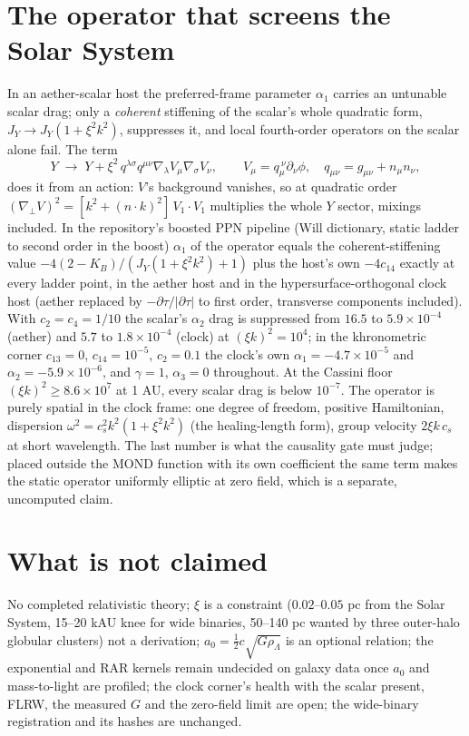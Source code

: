 \documentclass[11pt,letterpaper]{article}
\begin{document}
\section{The operator that screens the Solar System}
In an aether-scalar host the preferred-frame parameter $\alpha_1$ carries an untunable scalar drag; only a \emph{coherent} stiffening of the scalar's whole quadratic form, $J_Y\to J_Y(1+\xi^2k^2)$, suppresses it, and local fourth-order operators on the scalar alone fail. The term
\begin{equation}
Y\;\to\;Y+\xi^2\,q^{\lambda\sigma}q^{\mu\nu}\nabla_\lambda V_\mu\nabla_\sigma V_\nu,\qquad V_\mu=q_\mu^{\ \nu}\partial_\nu\phi,\quad q_{\mu\nu}=g_{\mu\nu}+n_\mu n_\nu,
\end{equation}
does it from an action: $V$'s background vanishes, so at quadratic order $(\nabla_\perp V)^2=[k^2+(n\!\cdot\!k)^2]\,V_1\!\cdot\!V_1$ multiplies the whole $Y$ sector, mixings included. In the repository's boosted PPN pipeline (Will dictionary, static ladder to second order in the boost) $\alpha_1$ of the operator equals the coherent-stiffening value $-4(2-K_B)/(J_Y(1+\xi^2k^2)+1)$ plus the host's own $-4c_{14}$ exactly at every ladder point, in the aether host and in the hypersurface-orthogonal clock host (aether replaced by $-\partial\tau/|\partial\tau|$ to first order, transverse components included). With $c_2=c_4=1/10$ the scalar's $\alpha_2$ drag is suppressed from $16.5$ to $5.9\times10^{-4}$ (aether) and $5.7$ to $1.8\times10^{-4}$ (clock) at $(\xi k)^2=10^4$; in the khronometric corner $c_{13}=0$, $c_{14}=10^{-5}$, $c_2=0.1$ the clock's own $\alpha_1=-4.7\times10^{-5}$ and $\alpha_2=-5.9\times10^{-6}$, and $\gamma=1$, $\alpha_3=0$ throughout. At the Cassini floor $(\xi k)^2\ge8.6\times10^7$ at 1 AU, every scalar drag is below $10^{-7}$. The operator is purely spatial in the clock frame: one degree of freedom, positive Hamiltonian, dispersion $\omega^2=c_s^2k^2(1+\xi^2k^2)$ (the healing-length form), group velocity $2\xi k\,c_s$ at short wavelength. The last number is what the causality gate must judge; placed outside the MOND function with its own coefficient the same term makes the static operator uniformly elliptic at zero field, which is a separate, uncomputed claim.
\section{What is not claimed}
No completed relativistic theory; $\xi$ is a constraint ($0.02$--$0.05$ pc from the Solar System, 15--20 kAU knee for wide binaries, 50--140 pc wanted by three outer-halo globular clusters) not a derivation; $a_0=\tfrac12c\sqrt{G\rho_\Lambda}$ is an optional relation; the exponential and RAR kernels remain undecided on galaxy data once $a_0$ and mass-to-light are profiled; the clock corner's health with the scalar present, FLRW, the measured $G$ and the zero-field limit are open; the wide-binary registration and its hashes are unchanged.
\end{document}
